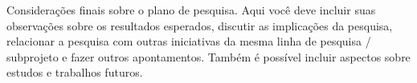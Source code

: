 
Considerações finais sobre o plano de pesquisa. Aqui você deve incluir suas observações sobre os resultados esperados, discutir as implicações da pesquisa, relacionar a pesquisa com outras iniciativas da mesma linha de pesquisa / subprojeto e fazer outros apontamentos. Também é possível incluir aspectos sobre estudos e trabalhos futuros.
